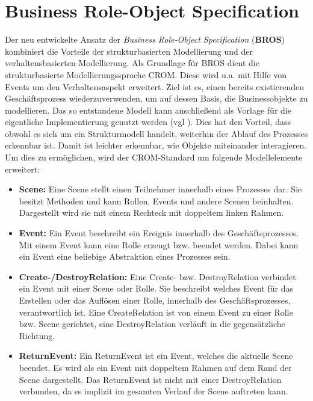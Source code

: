 \section{Business Role-Object Specification}

Der neu entwickelte Ansatz der \emph{Business Role-Object Specification} (\textbf{BROS}) kombiniert die Vorteile der strukturbasierten Modellierung und der verhaltensbasierten Modellierung.
Als Grundlage für BROS dient die strukturbasierte Modellierungssprache CROM.
Diese wird u.a. mit Hilfe von Events um den Verhaltensaspekt erweitert.
Ziel ist es, einen bereits existierenden Geschäftsprozess wiederzuverwenden, um auf dessen Basis, die Businessobjekte zu modellieren.
Das so entstandene Modell kann anschließend als Vorlage für die eigentliche Implementierung genutzt werden (vgl \cite{Schoen}).
Dies hat den Vorteil, dass obwohl es sich um ein Strukturmodell handelt, weiterhin der Ablauf des Prozesses erkennbar ist.
Damit ist leichter erkennbar, wie Objekte miteinander interagieren.
Um dies zu ermöglichen, wird der CROM-Standard um folgende Modellelemente erweitert:

\begin{itemize}
    \item \textbf{Scene:}
    Eine Scene stellt einen Teilnehmer innerhalb eines Prozesses dar.
    Sie besitzt Methoden und kann Rollen, Events und andere Scenen beinhalten.
    Dargestellt wird sie mit einem Rechteck mit doppeltem linken Rahmen.
    \item \textbf{Event:}
    Ein Event beschreibt ein Ereignis innerhalb des Geschäftsprozesses.
    Mit einem Event kann eine Rolle erzeugt bzw. beendet werden.
    Dabei kann ein Event eine beliebige Abstraktion eines Prozesses sein.
    \item \textbf{Create-/DestroyRelation:}
    Eine Create- bzw. DestroyRelation verbindet ein Event mit einer Scene oder Rolle.
    Sie beschreibt welches Event für das Erstellen oder das Auflösen einer Rolle, innerhalb des Geschäftsprozesses, verantwortlich ist.
    Eine CreateRelation ist von einem Event zu einer Rolle bzw. Scene gerichtet, eine DestroyRelation verläuft in die gegensätzliche Richtung.
    \item \textbf{ReturnEvent:}
    Ein ReturnEvent ist ein Event, welches die aktuelle Scene beendet.
    Es wird als ein Event mit doppeltem Rahmen auf dem Rand der Scene dargestellt.
    Das ReturnEvent ist nicht mit einer DestroyRelation verbunden, da es implizit im gesamten Verlauf der Scene auftreten kann.
\end{itemize}

